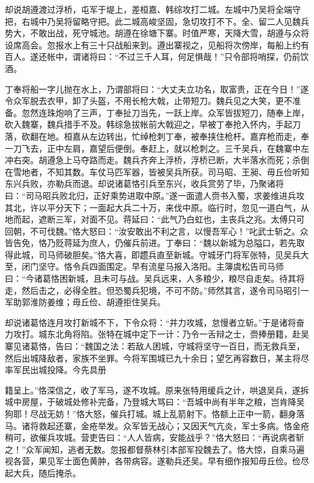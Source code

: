 却说胡遵渡过浮桥，屯军于堤上，差桓嘉、韩综攻打二城。左城中乃吴将全端守把，右城中乃吴将留略守把。此二城高峻坚固，急切攻打不下。全、留二人见魏兵势大，不敢出战，死守城池。胡遵在徐塘下寨。时值严寒，天降大雪，胡遵与众将设席高会。忽报水上有三十只战船来到。遵出寨视之，见船将次傍岸，每船上约有百人。遂还帐中，谓诸将曰：“不过三千人耳，何足惧哉！”只令部将哨探，仍前饮酒。

丁奉将船一字儿抛在水上，乃谓部将曰：“大丈夫立功名，取富贵，正在今日！”遂令众军脱去衣甲，卸了头盔，不用长枪大戟，止带短刀。魏兵见之大笑，更不准备。忽然连珠炮响了三声，丁奉扯刀当先，一跃上岸。众军皆拔短刀，随奉上岸，砍入魏寨，魏兵措手不及。韩综急拔帐前大戟迎之，早被丁奉抢入怀内，手起刀落，砍翻在地。桓嘉从左边转出，忙绰枪刺丁奉，被奉挟住枪杆。嘉弃枪而走，奉一刀飞去，正中左肩，嘉望后便倒。奉赶上，就以枪刺之。三千吴兵，在魏寨中左冲右突。胡遵急上马夺路而走。魏兵齐奔上浮桥，浮桥已断，大半落水而死；杀倒在雪地者，不知其数。车仗马匹军器，皆被吴兵所获。司马昭、王昶、毋丘俭听知东兴兵败，亦勒兵而退。却说诸葛恪引兵至东兴，收兵赏劳了毕，乃聚诸将曰：“司马昭兵败北归，正好乘势进取中原。”遂一面遣人赍书入蜀，求姜维进兵攻其北，许以平分天下；一面起大兵二十万，来伐中原。临行时，忽见一道白气，从地而起，遮断三军，对面不见。蒋延曰：“此气乃白虹也，主丧兵之兆。太傅只可回朝，不可伐魏。”恪大怒曰：“汝安敢出不利之言，以慢吾军心！”叱武士斩之。众皆告免，恪乃贬蒋延为庶人，仍催兵前进。丁奉曰：“魏以新城为总隘口，若先取得此城，司马师破胆矣。”恪大喜，即趱兵直至新城。守城牙门将军张特，见吴兵大至，闭门坚守。恪令兵四面围定。早有流星马报入洛阳。主簿虞松告司马师曰：“今诸葛恪困新城，且未可与战。吴兵远来，人多粮少，粮尽自走矣。待其将走，然后击之，必得全胜。但恐蜀兵犯境，不可不防。”师然其言，遂令司马昭引一军助郭淮防姜维；毋丘俭、胡遵拒住吴兵。

却说诸葛恪连月攻打新城不下，下令众将：“并力攻城，怠慢者立斩。”于是诸将奋力攻打。城东北角将陷。张特在城中定下一计：乃令一舌辩之士，赍捧册籍，赴吴寨见诸葛恪，告曰：“魏国之法：若敌人困城，守城将坚守一百日，而无救兵至，然后出城降敌者，家族不坐罪。今将军围城已九十余日；望乞再容数日，某主将尽率军民出城投降。今先具册

籍呈上。”恪深信之，收了军马，遂不攻城。原来张特用缓兵之计，哄退吴兵，遂拆城中房屋，于破城处修补完备，乃登城大骂曰：“吾城中尚有半年之粮，岂肯降吴狗耶！尽战无妨！”恪大怒，催兵打城。城上乱箭射下。恪额上正中一箭，翻身落马。诸将救起还寨，金疮举发。众军皆无战心；又因天气亢炎，军士多病。恪金疮稍可，欲催兵攻城。营吏告曰：“人人皆病，安能战乎？”恪大怒曰：“再说病者斩之！”众军闻知，逃者无数。忽报都督蔡林引本部军投魏去了。恪大惊，自乘马遍视各营，果见军士面色黄肿，各带病容。遂勒兵还吴。早有细作报知毋丘俭。俭尽起大兵，随后掩杀。

